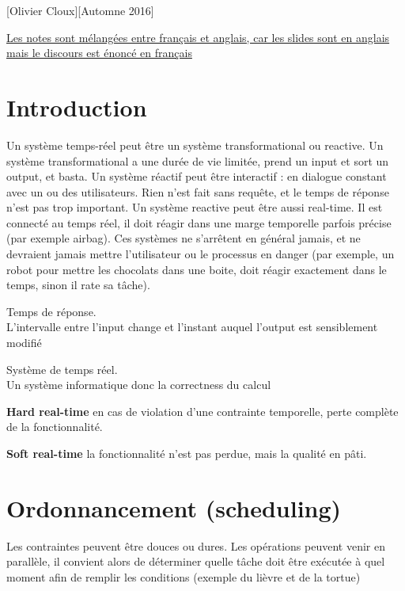 \documentclass[12pt,a4paper]{article}
\begin{document}
[Olivier Cloux][Automne 2016]
\newpage
\tableofcontents
{}
\begin{center}
    \uline{Les notes sont mélangées entre français et anglais, car les slides sont en anglais mais le discours est énoncé en français}    
\end{center}
\section{Introduction}
Un système temps-réel peut être un système transformational ou reactive. Un système transformational a une durée de vie limitée, prend un input et sort un output, et basta. Un système réactif peut être interactif : en dialogue constant avec un ou des utilisateurs. Rien n'est fait sans requête, et le temps de réponse n'est pas trop important. Un système reactive peut être aussi real-time. Il est connecté au temps réel, il doit réagir dans une marge temporelle parfois précise (par exemple airbag). Ces systèmes ne s'arrêtent en général jamais, et ne devraient jamais mettre l'utilisateur ou le processus en danger (par exemple, un robot pour mettre les chocolats dans une boite, doit réagir exactement dans le temps, sinon il rate sa tâche).
\begin{boite}
     Temps de réponse.\\L'intervalle entre l'input change et l'instant auquel l'output est sensiblement modifié
\end{boite}
\begin{boite}
     Système de temps réel.\\Un système informatique donc la correctness du calcul 
\end{boite}

\textbf{Hard real-time} en cas de violation d'une contrainte temporelle, perte complète de la fonctionnalité.

\textbf{Soft real-time} la fonctionnalité n'est pas perdue, mais la qualité en pâti.

\section{Ordonnancement (scheduling)}
Les contraintes peuvent être douces ou dures. Les opérations peuvent venir en parallèle, il convient alors de déterminer quelle tâche doit être exécutée à quel moment afin de remplir les conditions (exemple du lièvre et de la tortue)
\end{document}
